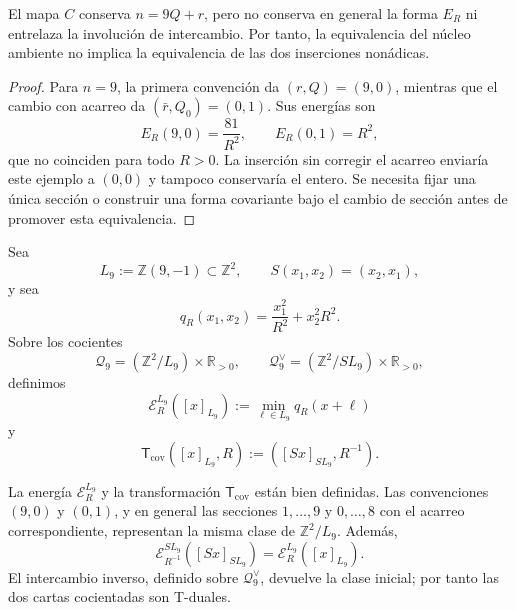 \begin{proposition}
\label{prop:cierre-vtm-obstruccion-secciones-nonadicas}
El mapa \(C\) conserva \(n=9Q+r\), pero no conserva en general la forma
\(E_R\) ni entrelaza la involución de intercambio. Por tanto, la equivalencia
del núcleo ambiente no implica la equivalencia de las dos inserciones
nonádicas.
\end{proposition}

\begin{proof}
Para \(n=9\), la primera convención da \((r,Q)=(9,0)\), mientras que el cambio con acarreo da
\((\bar r,Q_0)=(0,1)\). Sus energías son
\[
 E_R(9,0)=\frac{81}{R^2},
 \qquad E_R(0,1)=R^2,
\]
que no coinciden para todo \(R>0\). La inserción sin corregir
el acarreo enviaría este ejemplo a \((0,0)\) y tampoco conservaría el entero.
Se necesita fijar una única sección o construir una forma covariante bajo el
cambio de sección antes de promover esta equivalencia.
\end{proof}

\begin{definition}
\label{def:cierre-vtm-energia-covariante-seccion}
Sea
\[
 L_9:=\mathbb Z(9,-1)\subset\mathbb Z^2,
 \qquad
 S(x_1,x_2)=(x_2,x_1),
\]
y sea
\[
 q_R(x_1,x_2)=\frac{x_1^2}{R^2}+x_2^2R^2.
\]
Sobre los cocientes
\[
 \mathscr Q_9=(\mathbb Z^2/L_9)\times\mathbb R_{>0},
 \qquad
 \mathscr Q_9^\vee=(\mathbb Z^2/SL_9)\times\mathbb R_{>0},
\]
definimos
\[
 \mathcal E_R^{L_9}([x]_{L_9})
 :=\min_{\ell\in L_9}q_R(x+\ell)
\]
y
\[
 \mathsf T_{\mathrm{cov}}([x]_{L_9},R)
 :=([Sx]_{SL_9},R^{-1}).
\]
\end{definition}

\begin{theorem}
\label{thm:cierre-vtm-equivalencia-covariante-secciones}
La energía \(\mathcal E_R^{L_9}\) y la transformación
\(\mathsf T_{\mathrm{cov}}\) están bien definidas. Las convenciones
\((9,0)\) y \((0,1)\), y en general las secciones \(1,\ldots,9\) y
\(0,\ldots,8\) con el acarreo correspondiente, representan la misma clase
de \(\mathbb Z^2/L_9\). Además,
\[
 \boxed{
 \mathcal E_{R^{-1}}^{SL_9}([Sx]_{SL_9})
 =\mathcal E_R^{L_9}([x]_{L_9}).}
\]
El intercambio inverso, definido sobre \(\mathscr Q_9^\vee\), devuelve la
clase inicial; por tanto las dos cartas cocientadas son T-duales.
\end{theorem}

